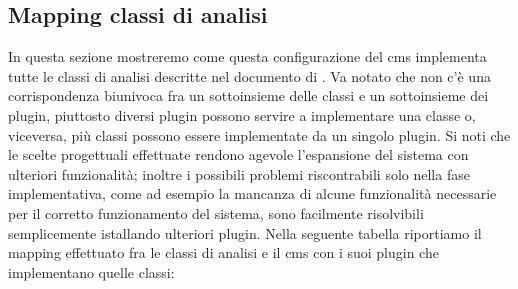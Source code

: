 \subsection{Mapping classi di analisi}
In questa sezione mostreremo come questa configurazione del \gls{cms} implementa tutte le classi di analisi descritte nel documento di . Va notato che non c'è una corrispondenza biunivoca fra un sottoinsieme delle classi e un sottoinsieme dei plugin, piuttosto diversi plugin possono servire a implementare una classe o, viceversa, più classi possono essere implementate da un singolo plugin.
Si noti che le scelte progettuali effettuate rendono agevole l'espansione del sistema con ulteriori funzionalità; inoltre i possibili problemi riscontrabili solo nella fase implementativa, come ad esempio la mancanza di alcune funzionalità necessarie per il corretto funzionamento del sistema, sono facilmente risolvibili semplicemente istallando ulteriori plugin. 
Nella seguente tabella riportiamo il mapping effettuato fra le classi di analisi e il \gls{cms} con i suoi plugin che implementano quelle classi:
